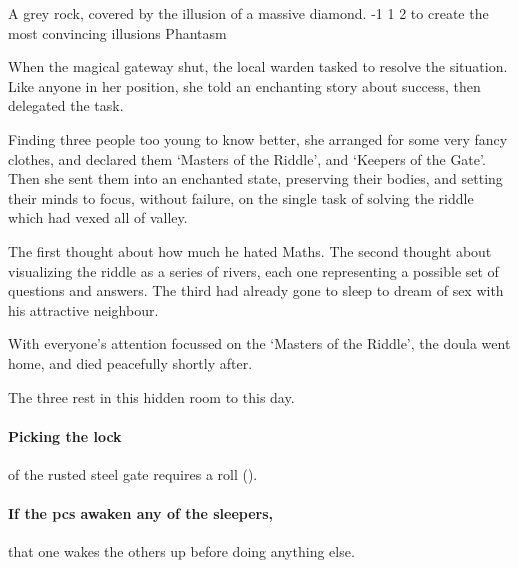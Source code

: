 \setcounter{wounds}{2}
  {A grey rock, covered by the illusion of a massive diamond.}%
  {-1}%
  {1}%
  {2}%
  {to create the most convincing illusions}%
  {Phantasm}%
  {
    \setcounter{Fire}{3}
    \setcounter{Earth}{2}
    \setcounter{Fate}{1}
    \setcounter{Water}{1}
    \setcounter{Academics}{2}
    \setcounter{Wyldcrafting}{1}
  }%

\showStdSpells[
  \setcounter{diceNo}{0}
]


\begin{exampletext}
  When the magical gateway shut, the local \gls{warden} tasked  to resolve the situation.
  Like anyone in her position, she told an enchanting story about success, then delegated the task.

  Finding three people too young to know better, she arranged for some very fancy clothes, and declared them `Masters of the Riddle', and `Keepers of the Gate'.
  Then she sent them into an enchanted state, preserving their bodies, and setting their minds to focus, without failure, on the single task of solving the riddle which had vexed all of \gls{valley}.

  The first thought about how much he hated Maths.
  The second thought about visualizing the riddle as a series of rivers, each one representing a possible set of questions and answers.
  The third had already gone to sleep to dream of sex with his attractive neighbour.

  With everyone's attention focussed on the `Masters of the Riddle', the \gls{doula} went home, and died peacefully shortly after.

  The three rest in this hidden room to this day.
\end{exampletext}

\paragraph{Picking the lock}
of the rusted steel gate requires a  roll (\tn[16]).

\paragraph{If the \glspl{pc} awaken any of the sleepers,}
that one wakes the others up before doing anything else.

